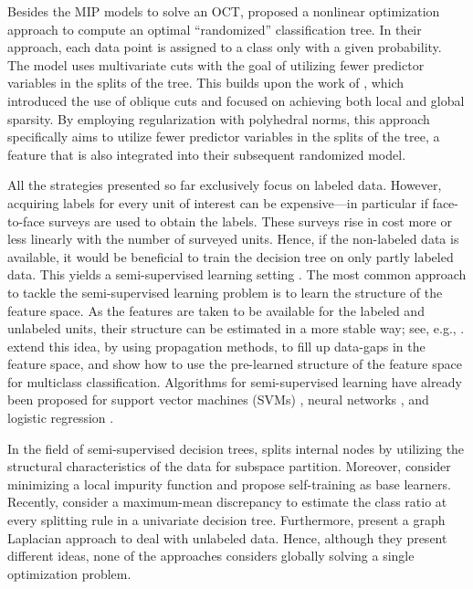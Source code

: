 \documentclass[a4paper,american,reqno]{amsart}
\newcommand{\rev}[1]{#1}
\begin{document}
Besides the MIP models to solve an OCT, \textcite{BLANQUERO2021105281}
proposed a nonlinear optimization approach to compute an optimal
``randomized'' classification tree.
In their approach, each data point is assigned to a class only with a
given probability.
The model uses \rev{multivariate} cuts with the goal of utilizing fewer predictor
variables in the splits of the tree. \rev{This builds upon the work of
  \textcite{BLANQUERO2020255}, which introduced the use of oblique
  cuts and focused on achieving both local and global sparsity. By
  employing regularization with polyhedral norms, this approach
  specifically aims to utilize fewer predictor variables in the splits
  of the tree, a feature that is also integrated into their subsequent
  randomized model.}

All the strategies presented so far exclusively focus on labeled
data.
However, acquiring labels for every unit of interest can be
expensive---in particular if \rev{face-to-face} surveys are used to
obtain the labels. \rev{These surveys rise in cost more or less
  linearly with the number of surveyed units. Hence, if the
  non-labeled data is available,} it would be beneficial to train the
decision tree on only partly labeled data.
This yields a semi-supervised learning
setting \parencite{semisupervised}. \rev{The most common approach to
  tackle the semi-supervised learning problem is to learn the
  structure of the feature space. As the features are taken to be
  available for the labeled and unlabeled units, their structure can
  be estimated in a more stable way; see, e.g., \textcite{belkin2006manifold,
    kemp2003semi}. \textcite{zhu2003semi} extend this idea, by using
  propagation methods, to fill up data-gaps in the feature space, and
  \textcite{blanco2023multiclass} show how to use the pre-learned
  structure of the feature space for multiclass classification.}
Algorithms for semi-supervised learning have already been proposed for
\rev{support vector machines (SVMs)}
\rev{\parencite{demiriz2000optimization,Chapelle,LAPSVM2}}, neural
networks \parencite{SemiSupNN,NeuralSemiSUpervised,NeuralSEMISUP}, and
logistic regression \parencite{LRSemi,SemiSupRL}.

In the field of semi-supervised decision trees,
\textcite{Semisupervised3} splits internal nodes by
utilizing the structural characteristics of the data for subspace
partition.
Moreover, \textcite{Semisupervised2} consider minimizing a local impurity
function and \textcite{SemisupervisedSF} propose self-training as base
learners.
Recently, \textcite{SemiSuptogrowing} consider a maximum-mean
discrepancy to  estimate the class ratio at every splitting rule
in a univariate decision tree.
Furthermore, \textcite{SemiSupervised4} present a graph Laplacian
approach to deal with unlabeled data.
Hence, although they present different ideas, none of the approaches
considers globally solving a single optimization problem.
\end{document}
